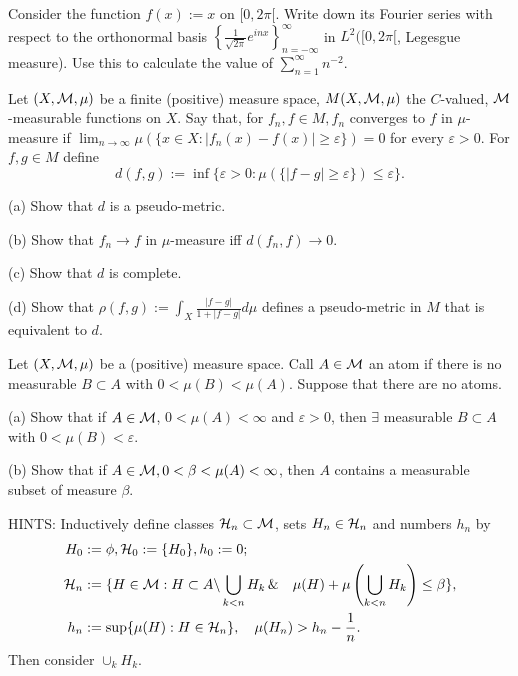 \documentclass{article}
\begin{document}
\begin{description}
[HINT: In (b), take $c=\int fd \mu$, $u = f(x)$, and integrate.]

\item[5.]
Consider the function $f(x) := x$ on $[0, 2\pi[$. Write down its Fourier
series with respect to the orthonormal basis
$\left\{\frac{1}{\sqrt{2\pi}} e^{inx} \right\}^\infty_{n=-\infty}$ in
$L^2 ([0, 2\pi[$, Legesgue measure). Use this to calculate the value of
$\sum^\infty_{n=1} n^{-2}$.

\item[6.]
Let $(X, {\cal M}, \mu)$ be a finite (positive) measure space,
$M(X, {\cal M}, \mu)$ the $C$-valued, ${\cal M}$-measurable functions on $X$.
Say that, for $f_n, f \in M, f_n$ converges to $f$ in $\mu$-measure if
$\lim_{n \to \infty} \mu(\{x \in X: |f_n (x) - f(x)| \geq \varepsilon\})=0$
for every $\varepsilon > 0$. For $f, g \in M$ define
$$d(f,g) :=\inf \{\varepsilon > 0 : \mu (\{|f-g| \geq \varepsilon \}) \leq
  \varepsilon \}.$$

\item[\quad] (a)
Show that $d$ is a pseudo-metric.

\item[\quad] (b)
Show that $f_n \to f$ in $\mu$-measure iff $d(f_n, f) \to 0$.

\item[\quad] (c)
Show that $d$ is complete.

\item[\quad] (d)
Show that $\rho (f,g) := \int_X \frac{|f-g|}{1+|f-g|} d\mu$ defines a
pseudo-metric in $M$ that is equivalent to $d$.

\item[7.]
Let $(X, {\cal M}, \mu)$ be a (positive) measure space. Call $A \in {\cal M}$
an atom if there is no measurable $B \subset A$ with $0 < \mu(B) < \mu (A)$.
Suppose that there are no atoms.

\item[\quad] (a)
Show that if $A\in {\cal M}$, $0 < \mu (A) < \infty$ and $\varepsilon >0$,
then $\exists$ measurable $B \subset A$ with $0 < \mu (B) < \varepsilon$.

\item[\quad] (b)
Show that if $A \in {\cal M}, 0 < \beta < \mu (A) < \infty$, then $A$
contains a measurable subset of measure $\beta$.

HINTS: Inductively define classes ${\cal H}_n \subset {\cal M}$, sets
$H_n \in {\cal H}_n$ and numbers $h_n$ by
$$\begin{aligned}
        H_0 &:= \phi, {\cal H}_0 := \{H_0\}, h_0 := 0; \\
        {\cal H}_n &:= \{H \in {\cal M}: H \subset A \backslash
        \bigcup_{k< n} H_k \, \& \quad \mu (H) + \mu \left(\bigcup_{k<n} H_k
        \right) \leq \beta\},\\
        h_n &:= \sup \{\mu(H) :H \in {\cal H}_n\}, \quad \mu (H_n) > h_n -
        \frac{1}{n}.
        \end{aligned}$$
Then consider $\cup_k H_k$.


\end{description}
\end{document}
